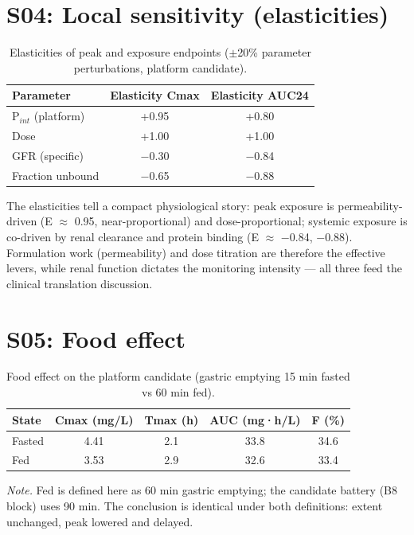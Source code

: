 \section{S04: Local sensitivity (elasticities)}
\label{sec:res-s04}

\begin{table}[htbp]
\centering
\caption{Elasticities of peak and exposure endpoints ($\pm$20\% parameter perturbations, platform candidate).}
\label{tab:res-s04}
\begin{tabular}{lcc}
\toprule
Parameter & Elasticity Cmax & Elasticity AUC24 \\
\midrule
P$_{int}$ (platform) & +0.95 & +0.80 \\
Dose                 & +1.00 & +1.00 \\
GFR (specific)       & $-$0.30 & $-$0.84 \\
Fraction unbound     & $-$0.65 & $-$0.88 \\
\bottomrule
\end{tabular}
\end{table}

The elasticities tell a compact physiological story: peak exposure is permeability-driven (E $\approx$ 0.95, near-proportional) and dose-proportional; systemic exposure is co-driven by renal clearance and protein binding (E $\approx$ $-$0.84, $-$0.88). Formulation work (permeability) and dose titration are therefore the effective levers, while renal function dictates the monitoring intensity --- all three feed the clinical translation discussion.

\section{S05: Food effect}
\label{sec:res-s05}

\begin{table}[htbp]
\centering
\caption{Food effect on the platform candidate (gastric emptying 15 min fasted vs 60 min fed).}
\label{tab:res-s05}
\begin{tabular}{lcccc}
\toprule
State & Cmax (mg/L) & Tmax (h) & AUC (mg·h/L) & F (\%) \\
\midrule
Fasted & 4.41 & 2.1 & 33.8 & 34.6 \\
Fed    & 3.53 & 2.9 & 32.6 & 33.4 \\
\bottomrule
\end{tabular}
\end{table}

\footnotesize\textit{Note.} Fed is defined here as 60 min gastric emptying; the candidate battery (B8 block) uses 90 min. The conclusion is identical under both definitions: extent unchanged, peak lowered and delayed.

